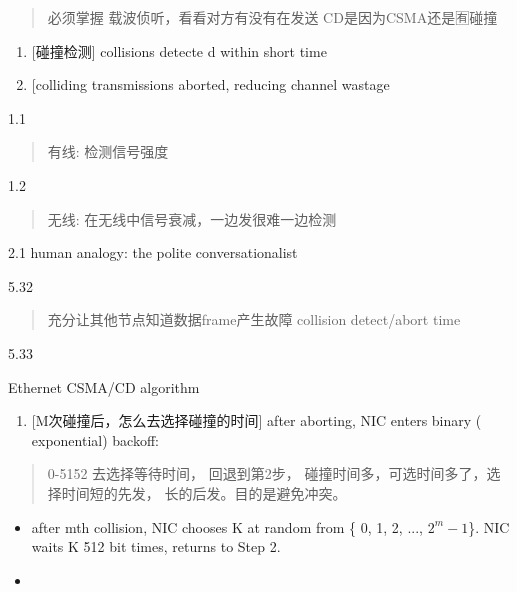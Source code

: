 \documentclass[
]{article}
\begin{document}
\begin{quote}
必须掌握 载波侦听，看看对方有没有在发送 CD是因为CSMA还是🈶️碰撞
\end{quote}

\begin{enumerate}
\def\labelenumi{\arabic{enumi}.}
\item
  {[}碰撞检测{]} collisions detecte d within short time
\item
  {[}colliding transmissions aborted, reducing channel wastage
\end{enumerate}

1.1

\begin{quote}
有线: 检测信号强度
\end{quote}

1.2

\begin{quote}
无线: 在无线中信号衰减，一边发很难一边检测
\end{quote}

2.1 human analogy: the polite conversationalist

\begin{quote}
\end{quote}

5.32

\begin{quote}
充分让其他节点知道数据frame产生故障 collision detect/abort time
\end{quote}

5.33

Ethernet CSMA/CD algorithm

\begin{enumerate}
\def\labelenumi{\arabic{enumi}.}
\item
  {[}M次碰撞后，怎么去选择碰撞的时间{]} after aborting, NIC enters
  binary ( exponential) backoff:
\end{enumerate}

\begin{quote}
0-5152 去选择等待时间， 回退到第2步，
碰撞时间多，可选时间多了，选择时间短的先发， 长的后发。目的是避免冲突。
\end{quote}

\begin{itemize}
\item
  after mth collision, NIC chooses K at random from \{ 0, 1, 2, ...,
  \( 2^m - 1 \)\}. NIC waits K 512 bit times, returns to Step 2.
\item
\end{itemize}
\end{document}

